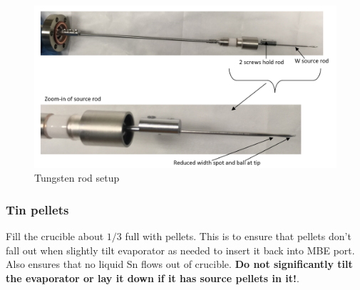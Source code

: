 \begin{figure}[H]
	\centering
	\includegraphics[width=1\textwidth]{W-rod-pics.png}  %
	\caption{Tungsten rod setup}
	\label{fig:W-evaporator}
\end{figure}


\subsubsection*{Tin pellets}
Fill the crucible about $1/3$ full with pellets. This is to ensure that pellets don't fall out when slightly tilt evaporator as needed to insert it back into MBE port. Also ensures that no liquid Sn flows out of crucible. \textbf{Do not significantly tilt the evaporator or lay it down if it has source pellets in it!}.
 
